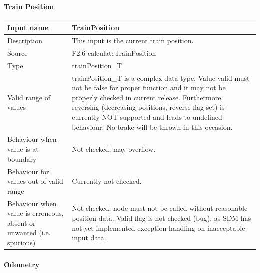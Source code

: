 \paragraph{Train Position}

\begin{longtable}{p{}p{}}
\toprule
Input name				& TrainPosition \\
\midrule
Description				& This input is the current train position. \\
\midrule
Source					& F2.6 calculateTrainPosition \\
\midrule
Type					& trainPosition\_T \\
\midrule
Valid range of values	& trainPosition\_T is a complex data type. Value valid must not be false for proper function and it may not be properly checked in current release. Furthermore, reversing (decreasing positions, reverse flag set) is currently NOT supported and leads to undefined behaviour. No brake will be thrown in this occasion.
\\
\midrule
Behaviour when value is at boundary	& Not checked, may overflow. \\
\midrule
Behaviour for values out of valid range	& Currently not checked. \\
\midrule
Behaviour when value is erroneous, absent or unwanted (i.e. spurious) & Not checked; node must not be called without reasonable position data. Valid flag is not checked (bug), as SDM has not yet implemented exception handling on inacceptable input data. \\
\bottomrule
\end{longtable}


\paragraph{Odometry}

